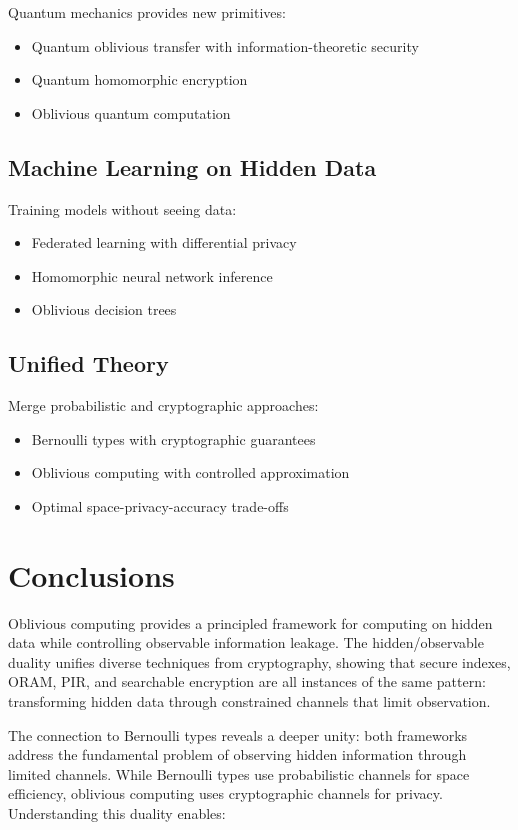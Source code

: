 \documentclass[11pt,final]{article}
\begin{document}
Quantum mechanics provides new primitives:
\begin{itemize}
    \item Quantum oblivious transfer with information-theoretic security
    \item Quantum homomorphic encryption
    \item Oblivious quantum computation
\end{itemize}

\subsection{Machine Learning on Hidden Data}

Training models without seeing data:
\begin{itemize}
    \item Federated learning with differential privacy
    \item Homomorphic neural network inference
    \item Oblivious decision trees
\end{itemize}

\subsection{Unified Theory}

Merge probabilistic and cryptographic approaches:
\begin{itemize}
    \item Bernoulli types with cryptographic guarantees
    \item Oblivious computing with controlled approximation
    \item Optimal space-privacy-accuracy trade-offs
\end{itemize}

\section{Conclusions}

Oblivious computing provides a principled framework for computing on hidden data while controlling observable information leakage. The hidden/observable duality unifies diverse techniques from cryptography, showing that secure indexes, ORAM, PIR, and searchable encryption are all instances of the same pattern: transforming hidden data through constrained channels that limit observation.

The connection to Bernoulli types reveals a deeper unity: both frameworks address the fundamental problem of observing hidden information through limited channels. While Bernoulli types use probabilistic channels for space efficiency, oblivious computing uses cryptographic channels for privacy. Understanding this duality enables:
\end{document}
